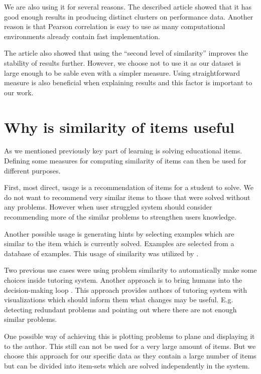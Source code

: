 \documentclass[
  digital, %
  table,   %
  nolof,     %
  nolot,     %
  nocover,
  color,
  final, %
]{fithesis3}
\begin{document}
We are also using it for several reasons. The described article showed that it has good enough results in producing distinct clusters on performance data. Another reason is that Pearson correlation is easy to use as many computational environments already contain fast implementation.

The article also showed that using the ``second level of similarity'' improves the stability of results further. However, we choose not to use it as our dataset is large enough to be sable even with a simpler measure. Using straightforward measure is also beneficial when explaining results and this factor is important to our work.

\section{Why is similarity of items useful}\label{why-is-similarity-of-items-useful}


As we mentioned previously key part of learning is solving educational items. Defining some measures for computing similarity of items can then be used for different purposes.

First, most direct, usage is a recommendation of items for a student to solve. We do not want to recommend very similar items to those that were solved without any problems. However when user struggled system should consider recommending more of the similar problems to strengthen users knowledge.

Another possible usage is generating hints by selecting examples which are similar to the item which is currently solved. Examples are selected from a database of examples. This usage of similarity was utilized by \citeauthor{hosseini2017study}\cite{hosseini2017study}.

Two previous use cases were using problem similarity to automatically make some choices inside tutoring system. Another approach is to bring humans into the decision-making loop \cite{baker2016stupid}. This approach provides authors of tutoring system with visualizations which should inform them what changes may be useful. E.g. detecting redundant problems and pointing out where there are not enough similar problems.

One possible way of achieving this is plotting problems to plane and displaying it to the author. This still can not be used for a very large amount of items. But we choose this approach for our specific data as they contain a large number of items but can be divided into item-sets which are solved independently in the system.
\end{document}
